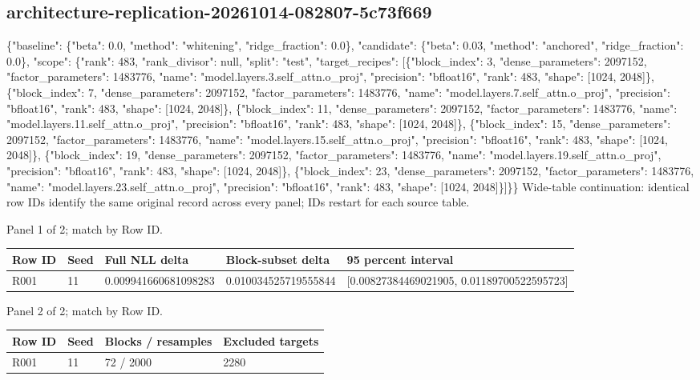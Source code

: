 \documentclass[10pt]{article}
\begin{document}
\subsection{architecture-replication-20261014-082807-5c73f669}
\{"baseline": \{"beta": 0.0, "method": "whitening", "ridge\_fraction": 0.0\}, "candidate": \{"beta": 0.03, "method": "anchored", "ridge\_fraction": 0.0\}, "scope": \{"rank": 483, "rank\_divisor": null, "split": "test", "target\_recipes": [\{"block\_index": 3, "dense\_parameters": 2097152, "factor\_parameters": 1483776, "name": "model.layers.3.self\_attn.o\_proj", "precision": "bfloat16", "rank": 483, "shape": [1024, 2048]\}, \{"block\_index": 7, "dense\_parameters": 2097152, "factor\_parameters": 1483776, "name": "model.layers.7.self\_attn.o\_proj", "precision": "bfloat16", "rank": 483, "shape": [1024, 2048]\}, \{"block\_index": 11, "dense\_parameters": 2097152, "factor\_parameters": 1483776, "name": "model.layers.11.self\_attn.o\_proj", "precision": "bfloat16", "rank": 483, "shape": [1024, 2048]\}, \{"block\_index": 15, "dense\_parameters": 2097152, "factor\_parameters": 1483776, "name": "model.layers.15.self\_attn.o\_proj", "precision": "bfloat16", "rank": 483, "shape": [1024, 2048]\}, \{"block\_index": 19, "dense\_parameters": 2097152, "factor\_parameters": 1483776, "name": "model.layers.19.self\_attn.o\_proj", "precision": "bfloat16", "rank": 483, "shape": [1024, 2048]\}, \{"block\_index": 23, "dense\_parameters": 2097152, "factor\_parameters": 1483776, "name": "model.layers.23.self\_attn.o\_proj", "precision": "bfloat16", "rank": 483, "shape": [1024, 2048]\}]\}\}
Wide-table continuation: identical row IDs identify the same original record across every panel; IDs restart for each source table.
\par\noindent Panel 1 of 2; match by Row ID.
{\scriptsize\setlength{\tabcolsep}{2pt}
\begin{longtable}{p{}p{}p{}p{}p{}}
Row ID & Seed & Full NLL delta & Block-subset delta & 95 percent interval \\
\hline\endhead
R001 & 11 & 0.009941660681098283 & 0.010034525719555844 & [0.00827384469021905, 0.01189700522595723] \\
\end{longtable}}
\par\noindent Panel 2 of 2; match by Row ID.
{\scriptsize\setlength{\tabcolsep}{2pt}
\begin{longtable}{p{}p{}p{}p{}}
Row ID & Seed & Blocks / resamples & Excluded targets \\
\hline\endhead
R001 & 11 & 72 / 2000 & 2280 \\
\end{longtable}}
\end{document}
